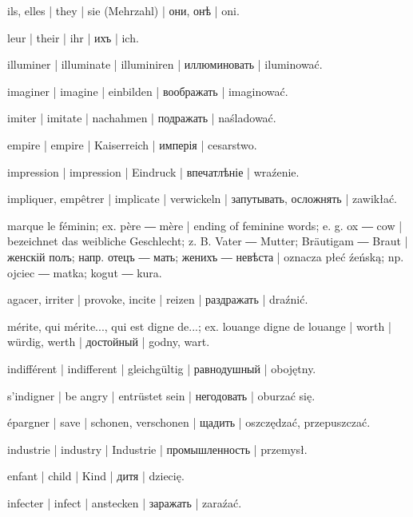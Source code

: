 \begin{outdent}{1em}
ils, elles | they | sie (Mehrzahl) | они, онѣ | oni.

\uvsubentry{}
leur | their | ihr | ихъ | ich.

illuminer | illuminate | illuminiren | иллюминовать | iluminować.

imaginer | imagine | einbilden | воображать | imaginować.

imiter | imitate | nachahmen | подражать | naśladować.

empire | empire | Kaiserreich | имперія | cesarstwo.

impression | impression | Eindruck | впечатлѣніе | wraźenie.

impliquer, empêtrer | implicate | verwickeln | запутывать,
осложнять | zawikłać.

marque le féminin; ex.  père ―  mère | ending
of feminine words; e. g.  ox ―  cow | bezeichnet das
weibliche Geschlecht; z. B.  Vater ―  Mutter;
 Bräutigam ―  Braut | женскій полъ; напр. 
отецъ ―  мать;  женихъ ―  невѣста | oznacza płeć źeńską; np.  ojciec ―  matka;  kogut
―  kura.

agacer, irriter | provoke, incite | reizen | раздражать | draźnić.

mérite, qui mérite..., qui est digne de...; ex.  louange  digne de louange | worth | würdig, werth | достойный | godny, wart.

indifférent | indifferent | gleichgültig | равнодушный | obojętny.

s’indigner | be angry | entrüstet sein | негодовать | oburzać się.

épargner | save | schonen, verschonen | щадить | oszczędzać,
przepuszczać.

industrie | industry | Industrie | промышленность | przemysł.

enfant | child | Kind | дитя | dziecię.

infecter | infect | anstecken | заражать | zaraźać.


\end{outdent}
